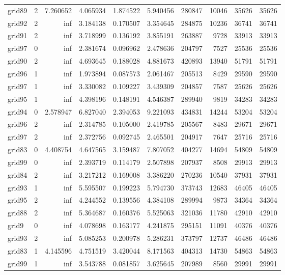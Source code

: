 \begin{longtable}{|l|r|r|r|r|r|r|r|r|r|}
grid89 & 2 & 7.260652 & 4.065934 & 1.874522 & 5.940456 & 280847 & 10046 & 35626 & 35626 \\
grid92 & 2 & inf & 3.184138 & 0.170507 & 3.354645 & 284875 & 10236 & 36741 & 36741 \\
grid91 & 2 & inf & 3.718999 & 0.136192 & 3.855191 & 263887 & 9728 & 33913 & 33913 \\
grid97 & 0 & inf & 2.381674 & 0.096962 & 2.478636 & 204797 & 7527 & 25536 & 25536 \\
grid90 & 2 & inf & 4.693645 & 0.188028 & 4.881673 & 420893 & 13940 & 51791 & 51791 \\
grid96 & 1 & inf & 1.973894 & 0.087573 & 2.061467 & 205513 & 8429 & 29590 & 29590 \\
grid97 & 1 & inf & 3.330082 & 0.109227 & 3.439309 & 204857 & 7587 & 25626 & 25626 \\
grid95 & 1 & inf & 4.398196 & 0.148191 & 4.546387 & 289940 & 9819 & 34283 & 34283 \\
grid94 & 0 & 2.578947 & 6.827040 & 2.394053 & 9.221093 & 434831 & 14244 & 53204 & 53204 \\
grid96 & 2 & inf & 2.314785 & 0.105000 & 2.419785 & 205567 & 8483 & 29671 & 29671 \\
grid97 & 2 & inf & 2.372756 & 0.092745 & 2.465501 & 204917 & 7647 & 25716 & 25716 \\
grid83 & 0 & 4.408754 & 4.647565 & 3.159487 & 7.807052 & 404277 & 14694 & 54809 & 54809 \\
grid99 & 0 & inf & 2.393719 & 0.114179 & 2.507898 & 207937 & 8508 & 29913 & 29913 \\
grid84 & 2 & inf & 3.217212 & 0.169008 & 3.386220 & 270236 & 10540 & 37931 & 37931 \\
grid93 & 1 & inf & 5.595507 & 0.199223 & 5.794730 & 373743 & 12683 & 46405 & 46405 \\
grid95 & 2 & inf & 4.244552 & 0.139556 & 4.384108 & 289994 & 9873 & 34364 & 34364 \\
grid88 & 2 & inf & 5.364687 & 0.160376 & 5.525063 & 321036 & 11780 & 42910 & 42910 \\
grid9 & 0 & inf & 4.078698 & 0.163177 & 4.241875 & 295151 & 11091 & 40376 & 40376 \\
grid93 & 2 & inf & 5.085253 & 0.200978 & 5.286231 & 373797 & 12737 & 46486 & 46486 \\
grid83 & 1 & 4.145596 & 4.751519 & 3.420044 & 8.171563 & 404313 & 14730 & 54863 & 54863 \\
grid99 & 1 & inf & 3.543788 & 0.081857 & 3.625645 & 207989 & 8560 & 29991 & 29991 \\

\end{longtable}
